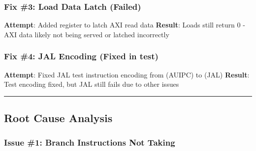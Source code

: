 \subsubsection{Fix \#3: Load Data Latch (Failed)}\label{cr:fix:rtl-debug-report:fix-3-load-data-latch-failed}

\begin{record}

\textbf{Attempt}: Added  register to latch AXI read
data \textbf{Result}: Loads still return 0 - AXI data likely not being
served or latched incorrectly

\end{record}

\subsubsection{Fix \#4: JAL Encoding (Fixed in test)}\label{cr:fix:rtl-debug-report:fix-4-jal-encoding-fixed-in-test}

\begin{record}

\textbf{Attempt}: Fixed JAL test instruction encoding from
 (AUIPC) to  (JAL) \textbf{Result}:
Test encoding fixed, but JAL still fails due to other issues

\begin{center}\rule{0.5\linewidth}{0.5pt}\end{center}

\end{record}

\subsection{Root Cause Analysis}\label{cr:fix:rtl-debug-report:root-cause-analysis}

\subsubsection{Issue \#1: Branch Instructions Not Taking}\label{cr:fix:rtl-debug-report:issue-1-branch-instructions-not-taking}


